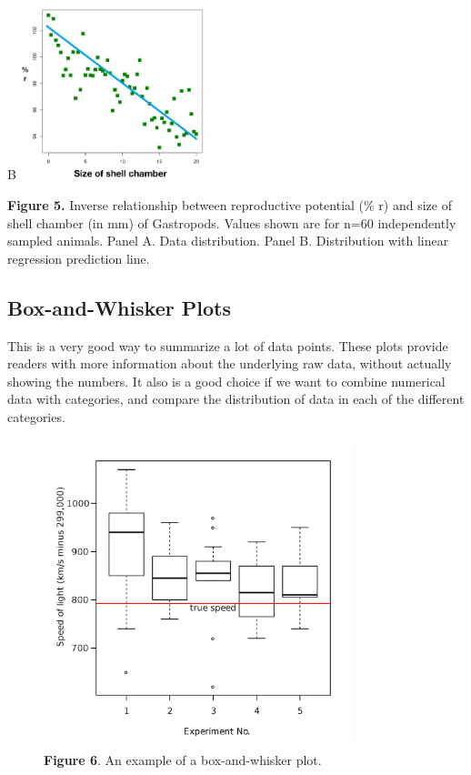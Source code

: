 \documentclass[
]{book}
\begin{document}
B
\includegraphics[width=0.4\textwidth,height=\textheight]{images/Scatter_diagram_regression.png}

\textbf{Figure 5.} Inverse relationship between reproductive potential (\% r) and size of shell chamber (in mm) of Gastropods. Values shown are for n=60 independently sampled animals. Panel A. Data distribution. Panel B. Distribution with linear regression prediction line.

\hypertarget{box-and-whisker-plots}{%
\subsection{Box-and-Whisker Plots}\label{box-and-whisker-plots}}

This is a very good way to summarize a lot of data points. These plots provide readers with more information about the underlying raw data, without actually showing the numbers. It also is a good choice if we want to combine numerical data with categories, and compare the distribution of data in each of the different categories.

\begin{figure}
\centering
\includegraphics[width=0.8\textwidth,height=\textheight]{images/boxplot.png}
\caption{\textbf{Figure 6}. An example of a box-and-whisker plot.}
\end{figure}
\end{document}
